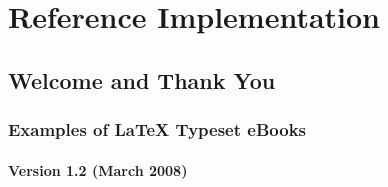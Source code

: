 \chapter{Reference Implementation}
\label{Chapter4}

\section{Welcome and Thank You}

\subsection{Examples of \LaTeX{} Typeset eBooks}

\subsubsection*{Version 1.2 (March 2008)}

